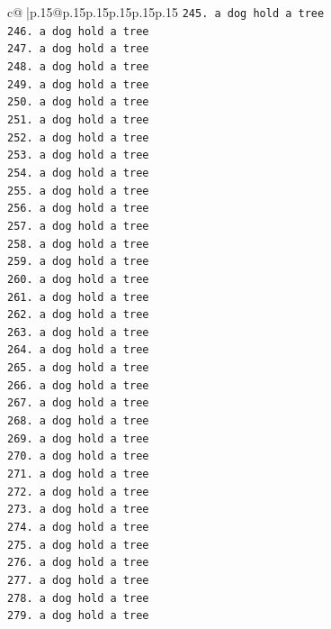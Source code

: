 \documentclass{article}
\begin{document}
{\begin{supertabular}{c@{$\;$}|p{.15\linewidth}@{}p{.15\linewidth}p{.15\linewidth}p{.15\linewidth}p{.15\linewidth}p{.15\linewidth}}
{{{\texttt{245. a dog hold a tree} \\
\texttt{246. a dog hold a tree} \\
\texttt{247. a dog hold a tree} \\
\texttt{248. a dog hold a tree} \\
\texttt{249. a dog hold a tree} \\
\texttt{250. a dog hold a tree} \\
\texttt{251. a dog hold a tree} \\
\texttt{252. a dog hold a tree} \\
\texttt{253. a dog hold a tree} \\
\texttt{254. a dog hold a tree} \\
\texttt{255. a dog hold a tree} \\
\texttt{256. a dog hold a tree} \\
\texttt{257. a dog hold a tree} \\
\texttt{258. a dog hold a tree} \\
\texttt{259. a dog hold a tree} \\
\texttt{260. a dog hold a tree} \\
\texttt{261. a dog hold a tree} \\
\texttt{262. a dog hold a tree} \\
\texttt{263. a dog hold a tree} \\
\texttt{264. a dog hold a tree} \\
\texttt{265. a dog hold a tree} \\
\texttt{266. a dog hold a tree} \\
\texttt{267. a dog hold a tree} \\
\texttt{268. a dog hold a tree} \\
\texttt{269. a dog hold a tree} \\
\texttt{270. a dog hold a tree} \\
\texttt{271. a dog hold a tree} \\
\texttt{272. a dog hold a tree} \\
\texttt{273. a dog hold a tree} \\
\texttt{274. a dog hold a tree} \\
\texttt{275. a dog hold a tree} \\
\texttt{276. a dog hold a tree} \\
\texttt{277. a dog hold a tree} \\
\texttt{278. a dog hold a tree} \\
\texttt{279. a dog hold a tree} \\
}}}
\end{supertabular}}
\end{document}
